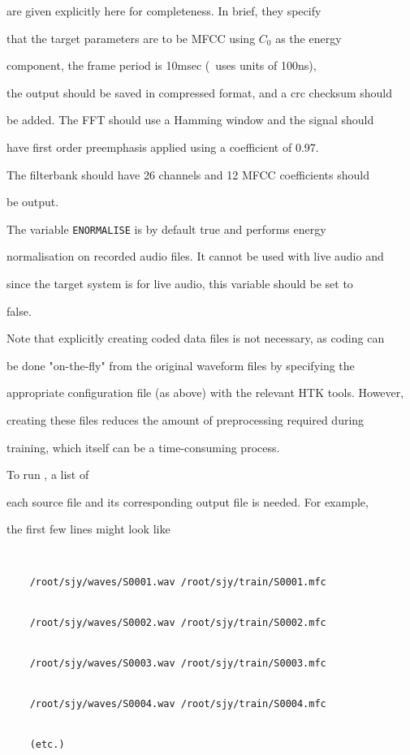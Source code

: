 are given explicitly here for completeness.  In brief, they specify


that the target parameters are to be MFCC using $C_0$ as the energy


component, the frame period is 10msec (\HTK\ uses units of 100ns),


the output should be saved in compressed format, and a crc checksum should


be added.  The FFT should use a Hamming window and the signal should


have first order preemphasis applied using a coefficient of 0.97.


The filterbank should have 26 channels and 12 MFCC coefficients should


be output. 


The variable \texttt{ENORMALISE} is by default true and performs energy


normalisation on recorded audio files. It cannot be used with live audio and


since the target system is for live audio, this variable should be set to


false.





Note that explicitly creating coded data files is not necessary, as coding can


be done "on-the-fly" from the original waveform files by specifying the


appropriate configuration file (as above) with the relevant HTK tools. However,


creating these files reduces the amount of preprocessing required during


training, which itself can be a time-consuming process.





To run ,  a list of


each source file and its corresponding output file is needed.  For example,


the first few lines might look like


\begin{verbatim}


    /root/sjy/waves/S0001.wav /root/sjy/train/S0001.mfc


    /root/sjy/waves/S0002.wav /root/sjy/train/S0002.mfc


    /root/sjy/waves/S0003.wav /root/sjy/train/S0003.mfc


    /root/sjy/waves/S0004.wav /root/sjy/train/S0004.mfc


    (etc.)


\end{verbatim}


